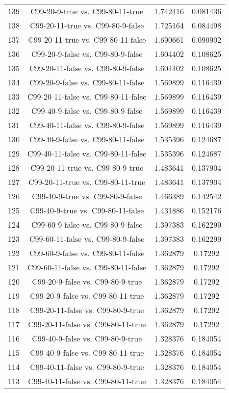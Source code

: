 \documentclass[a4paper,10pt]{article}
\begin{document}
\begin{landscape}
\begin{table}[!htp]
\begin{tabular}{cccc}
139&C99-20-9-true vs. C99-80-11-true&1.742416&0.081436\\
138&C99-20-11-true vs. C99-80-9-false&1.725164&0.084498\\
137&C99-20-11-true vs. C99-80-11-false&1.690661&0.090902\\
136&C99-20-9-false vs. C99-80-9-false&1.604402&0.108625\\
135&C99-20-11-false vs. C99-80-9-false&1.604402&0.108625\\
134&C99-20-9-false vs. C99-80-11-false&1.569899&0.116439\\
133&C99-20-11-false vs. C99-80-11-false&1.569899&0.116439\\
132&C99-40-9-false vs. C99-80-9-false&1.569899&0.116439\\
131&C99-40-11-false vs. C99-80-9-false&1.569899&0.116439\\
130&C99-40-9-false vs. C99-80-11-false&1.535396&0.124687\\
129&C99-40-11-false vs. C99-80-11-false&1.535396&0.124687\\
128&C99-20-11-true vs. C99-80-9-true&1.483641&0.137904\\
127&C99-20-11-true vs. C99-80-11-true&1.483641&0.137904\\
126&C99-40-9-true vs. C99-80-9-false&1.466389&0.142542\\
125&C99-40-9-true vs. C99-80-11-false&1.431886&0.152176\\
124&C99-60-9-false vs. C99-80-9-false&1.397383&0.162299\\
123&C99-60-11-false vs. C99-80-9-false&1.397383&0.162299\\
122&C99-60-9-false vs. C99-80-11-false&1.362879&0.17292\\
121&C99-60-11-false vs. C99-80-11-false&1.362879&0.17292\\
120&C99-20-9-false vs. C99-80-9-true&1.362879&0.17292\\
119&C99-20-9-false vs. C99-80-11-true&1.362879&0.17292\\
118&C99-20-11-false vs. C99-80-9-true&1.362879&0.17292\\
117&C99-20-11-false vs. C99-80-11-true&1.362879&0.17292\\
116&C99-40-9-false vs. C99-80-9-true&1.328376&0.184054\\
115&C99-40-9-false vs. C99-80-11-true&1.328376&0.184054\\
114&C99-40-11-false vs. C99-80-9-true&1.328376&0.184054\\
113&C99-40-11-false vs. C99-80-11-true&1.328376&0.184054\\

\end{tabular}
\end{table}
\end{landscape}
\end{document}
